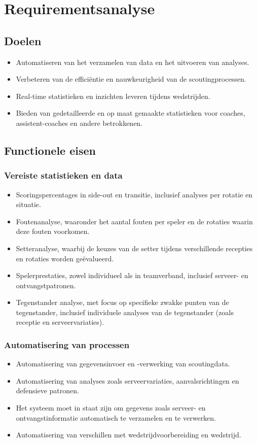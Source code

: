 \section{Requirementsanalyse}
\label{sec:requirementsanalyse}

\subsection{Doelen}
\begin{itemize}
  \item Automatiseren van het verzamelen van data en het uitvoeren van analyses.
  \item Verbeteren van de efficiëntie en nauwkeurigheid van de scoutingprocessen.
  \item Real-time statistieken en inzichten leveren tijdens wedstrijden.
  \item Bieden van gedetailleerde en op maat gemaakte statistieken voor coaches, assistent-coaches en andere betrokkenen.
\end{itemize}

\subsection{Functionele eisen}
\subsubsection{Vereiste statistieken en data}
\begin{itemize}
  \item Scoringspercentages in side-out en transitie, inclusief analyses per rotatie en situatie.
  \item Foutenanalyse, waaronder het aantal fouten per speler en de rotaties waarin deze fouten voorkomen.
  \item Setteranalyse, waarbij de keuzes van de setter tijdens verschillende recepties en rotaties worden geëvalueerd.
  \item Spelerprestaties, zowel individueel als in teamverband, inclusief serveer- en ontvangstpatronen.
  \item Tegenstander analyse, met focus op specifieke zwakke punten van de tegenstander, inclusief individuele analyses van de tegenstander (zoals receptie en serveervariaties).
\end{itemize}

\subsubsection{Automatisering van processen}
\begin{itemize}
  \item Automatisering van gegevensinvoer en -verwerking van scoutingdata.
  \item Automatisering van analyses zoals serveervariaties, aanvalsrichtingen en defensieve patronen.
  \item Het systeem moet in staat zijn om gegevens zoals serveer- en ontvangstinformatie automatisch te verzamelen en te verwerken.
  \item Automatisering van verschillen met wedstrijdvoorbereiding en wedstrijd.
\end{itemize}

